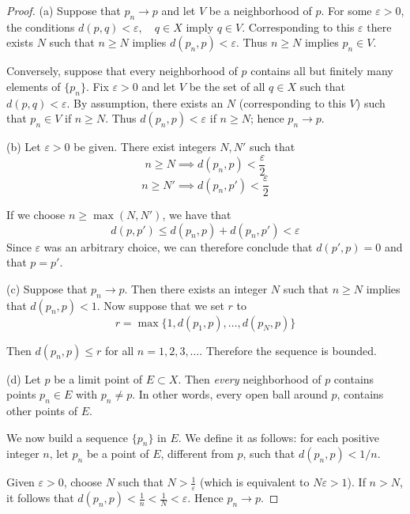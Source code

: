 \begin{proof}
(a) Suppose that $p_n \to p$ and let $V$ be a neighborhood of $p$.  For some $\varepsilon > 0 $, the conditions $d(p,q)< \varepsilon, \quad q \in X$ imply $q \in V$.  Corresponding to this $\varepsilon$ there exists $N$ such that $n \geq N$ implies $d(p_n, p)< \varepsilon$.  Thus $n \geq N$ implies $p_n \in V$.

Conversely, suppose that every neighborhood of $p$ contains all but finitely many elements of $\{p_n\}$.  Fix $\varepsilon>0$ and let $V$ be the set of all $q \in X$ such that $d(p,q)< \varepsilon$.  By assumption, there exists an $N$ (corresponding to this $V$) such that $p_n \in V$ if $n \geq N$.  Thus $d(p_n, p) < \varepsilon$ if $n \geq N$; hence $p_n \to p$.

(b)  Let $\varepsilon > 0$ be given.  There exist integers $N, N'$ such that
\[n\geq N \implies d(p_n, p) < \frac{\varepsilon}{2}\]
\[n \geq N' \implies d(p_n, p') < \frac{\varepsilon}{2}\]

If we choose $n\geq \max(N, N')$, we have that 
\[d(p,p') \leq d(p_n,p) + d(p_n, p') < \varepsilon\]
Since $\varepsilon$ was an arbitrary choice, we can therefore conclude that $d(p',p) =0$ and that $p=p'$.

(c)  Suppose that $p_n \to p$.  Then there exists an integer $N$ such that $n\geq N$ implies that $d(p_n, p) < 1$.  Now suppose that we set $r$ to
\[r = \max \{1, d(p_1, p), \ldots, d(p_N, p)\}\]

Then $d(p_n, p) \leq r$ for all $n =1, 2, 3, \ldots$.  Therefore the sequence is bounded.

(d) Let $p$ be a limit point of $E \subset X$.  Then \emph{every} neighborhood of $p$ contains points $p_n\in E$ with $p_n\neq p$. In other words, every open ball around $p$, contains other points of $E$.  

We now build a sequence $\{p_n\}$ in $E$.  We define it as follows:  for each positive integer $n$,  let $p_n$ be a point of $E$, different from $p$, such that $d(p_n, p) < 1/n$.  

Given $\varepsilon > 0$, choose $N$ such that $N > \frac{1}{\varepsilon}$ (which is equivalent to $N\varepsilon>1$).  If $n > N$, it follows that $d(p_n, p)< \frac{1}{n} < \frac{1}{N} < \varepsilon$.  Hence $p_n \to p$.
\end{proof}


